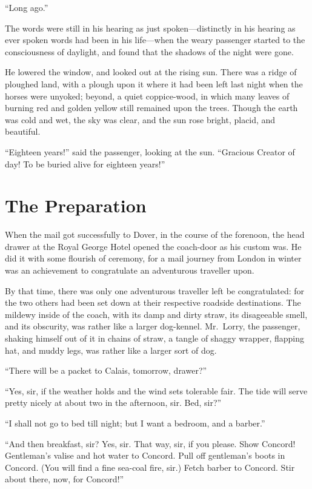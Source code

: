 ``Long ago.''

The words were still in his hearing as just spoken---distinctly in his
hearing as ever spoken words had been in his life---when the weary
passenger started to the consciousness of daylight, and found that
the shadows of the night were gone.

He lowered the window, and looked out at the rising sun.  There was a
ridge of ploughed land, with a plough upon it where it had been left
last night when the horses were unyoked; beyond, a quiet coppice-wood,
in which many leaves of burning red and golden yellow still remained
upon the trees.  Though the earth was cold and wet, the sky was
clear, and the sun rose bright, placid, and beautiful.

``Eighteen years!'' said the passenger, looking at the sun.
``Gracious Creator of day!  To be buried alive for eighteen years!''



\chapter{The Preparation}


When the mail got successfully to Dover, in the course of the
forenoon, the head drawer at the Royal George Hotel opened the
coach-door as his custom was.  He did it with some flourish of
ceremony, for a mail journey from London in winter was an achievement
to congratulate an adventurous traveller upon.

By that time, there was only one adventurous traveller left be
congratulated:  for the two others had been set down at their
respective roadside destinations.  The mildewy inside of the coach,
with its damp and dirty straw, its disageeable smell, and its
obscurity, was rather like a larger dog-kennel.  Mr.\ Lorry, the
passenger, shaking himself out of it in chains of straw, a tangle of
shaggy wrapper, flapping hat, and muddy legs, was rather like a
larger sort of dog.

``There will be a packet to Calais, tomorrow, drawer?''

``Yes, sir, if the weather holds and the wind sets tolerable fair.
The tide will serve pretty nicely at about two in the afternoon,
sir.  Bed, sir?''

``I shall not go to bed till night; but I want a bedroom, and a barber.''

``And then breakfast, sir?  Yes, sir.  That way, sir, if you please.
Show Concord!  Gentleman's valise and hot water to Concord.  Pull off
gentleman's boots in Concord. (You will find a fine sea-coal fire,
sir.) Fetch barber to Concord.  Stir about there, now, for Concord!''


